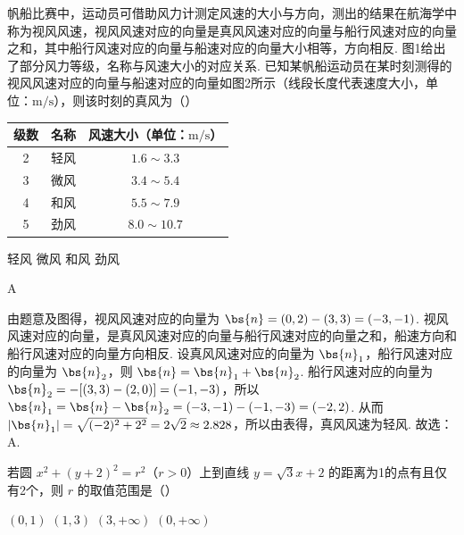 \documentclass[UTF8,a4paper,oneside,11pt]{ctexbook}
\begin{document}
\begin{problem}

帆船比赛中，运动员可借助风力计测定风速的大小与方向，测出的结果在航海学中称为视风风速，视风风速对应的向量是真风风速对应的向量与船行风速对应的向量之和，其中船行风速对应的向量与船速对应的向量大小相等，方向相反.
图1给出了部分风力等级，名称与风速大小的对应关系.
已知某帆船运动员在某时刻测得的视风风速对应的向量与船速对应的向量如图2所示（线段长度代表速度大小，单位：\(\mathrm{m/s}\)），则该时刻的真风为（\quad）

\begin{center}
\begin{tabular}{|c|c|c|}
\hline
级数 & 名称 & 风速大小（单位：\(\mathrm{m/s}\)） \\
\hline
2 & 轻风 & \(1.6\sim3.3\) \\
\hline
3 & 微风 & \(3.4\sim5.4\) \\
\hline
4 & 和风 & \(5.5\sim7.9\) \\
\hline
5 & 劲风 & \(8.0\sim10.7\) \\
\hline
\end{tabular}
\end{center}


\choices
    {轻风}
    {微风}
    {和风}
    {劲风}
\end{problem}

\begin{answer}
A
\end{answer}

\begin{solution}
由题意及图得，视风风速对应的向量为 \(\bs{n}=(0,2)-(3,3)=(-3,-1)\). 视风风速对应的向量，是真风风速对应的向量与船行风速对应的向量之和，船速方向和船行风速对应的向量方向相反. 设真风风速对应的向量为 \(\bs{n}_1\)，船行风速对应的向量为 \(\bs{n}_2\)，则 \(\bs{n} = \bs{n}_1 + \bs{n}_2\). 船行风速对应的向量为 \(\bs{n}_2=-[(3,3)-(2,0)]=(-1,-3)\)，所以 \(\bs{n}_1=\bs{n}-\bs{n}_2=(-3,-1)-(-1,-3)=(-2,2)\). 从而 \(|\bs{n}_1|=\sqrt{(-2)^2+2^2}=2\sqrt{2}\approx 2.828\)，所以由表得，真风风速为轻风. 故选：A.
\end{solution}

\begin{problem}
若圆 \(x^2 + (y+2)^2 = r^2\)（\(r>0\)）上到直线 \(y = \sqrt{3}x + 2\) 的距离为1的点有且仅有2个，则 \(r\) 的取值范围是（\quad）

\choices
    {\((0,1)\)}
    {\((1,3)\)}
    {\((3,+\infty)\)}
    {\((0,+\infty)\)}
\end{problem}
\end{document}
